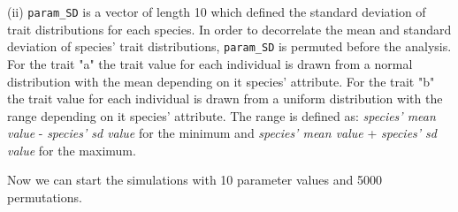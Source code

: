 \documentclass[12pt]{article}\usepackage[]{graphicx}\usepackage[]{color}
\begin{document}
(ii) \texttt{param\_{}SD} is a vector of length 10 which defined the standard deviation of trait distributions for each species. In order to decorrelate the mean and standard deviation of species' trait distributions, \texttt{param\_{}SD} is permuted before the analysis. 
\\

For the trait "a" the trait value for each individual is drawn from a normal distribution with the mean depending on it species' attribute. For the trait "b" the trait value for each individual is drawn from a uniform distribution with the range depending on it species' attribute. The range is defined as: \textit{species' mean value} - \textit{species' sd value} for the minimum and \textit{species' mean value} + \textit{species' sd value} for the maximum.

Now we can start the simulations with 10 parameter values and 5000 permutations. 
\end{document}

